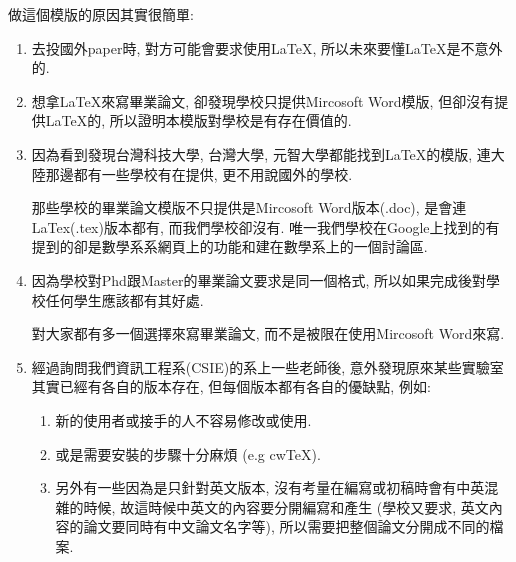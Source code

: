 

做這個模版的原因其實很簡單:

\begin{enumerate}
  \item
  {
    去投國外paper時, 對方可能會要求使用LaTeX, 所以未來要懂LaTeX是不意外的.
  } %

  \item
  {
    想拿LaTeX來寫畢業論文, 卻發現學校只提供Mircosoft Word模版, 但卻沒有提供LaTeX的, 所以證明本模版對學校是有存在價值的.
  } %

  \item
  {
    因為看到發現台灣科技大學, 台灣大學, 元智大學都能找到LaTeX的模版, 連大陸那邊都有一些學校有在提供, 更不用說國外的學校.

    那些學校的畢業論文模版不只提供是Mircosoft Word版本(.doc), 是會連LaTex(.tex)版本都有, 而我們學校卻沒有. 唯一我們學校在Google上找到的有提到的卻是數學系系網頁上的功能和建在數學系上的一個討論區.
  } %

  \item
  {
    因為學校對Phd跟Master的畢業論文要求是同一個格式, 所以如果完成後對學校任何學生應該都有其好處.

    對大家都有多一個選擇來寫畢業論文, 而不是被限在使用Mircosoft Word來寫.
  } %

  \item
  {
    經過詢問我們資訊工程系(CSIE)的系上一些老師後, 意外發現原來某些實驗室其實已經有各自的版本存在, 但每個版本都有各自的優缺點, 例如:

    \begin{enumerate}

      \item
      {
        新的使用者或接手的人不容易修改或使用.
      } %

      \item
      {
        或是需要安裝的步驟十分麻煩 (e.g cwTeX).
      } %

      \item
      {
        另外有一些因為是只針對英文版本, 沒有考量在編寫或初稿時會有中英混雜的時候, 故這時候中英文的內容要分開編寫和產生 (學校又要求, 英文內容的論文要同時有中文論文名字等), 所以需要把整個論文分開成不同的檔案.
      } %
    \end{enumerate}
  } %
\end{enumerate}

